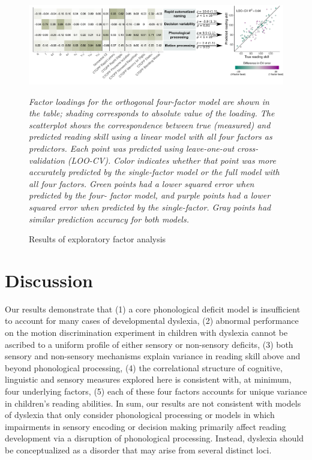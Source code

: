 \documentclass[../uwthesis.tex]{subfiles}
\begin{document}
\begin{figure}
    \centering
    \caption{Results of exploratory factor analysis}
    \label{fig:p3_fig_5}
    \includegraphics[width=18cm]{images/paper_3/5_factor_analysis.png}
    \item \textit{Factor loadings for the orthogonal four-factor model are shown in the table; shading
    corresponds to absolute value of the loading. The scatterplot shows the correspondence between
    true (measured) and predicted reading skill using a linear model with all four factors as
    predictors. Each point was predicted using leave-one-out cross-validation (LOO-CV). Color
    indicates whether that point was more accurately predicted by the single-factor model or the full
    model with all four factors. Green points had a lower squared error when predicted by the four-
    factor model, and purple points had a lower squared error when predicted by the single-factor.
    Gray points had similar prediction accuracy for both models.}
\end{figure}

\section{Discussion}
Our results demonstrate that (1) a core phonological deficit model is insufficient to account for many cases of developmental dyslexia, (2) abnormal performance on the motion discrimination experiment in children with dyslexia cannot be ascribed to a uniform profile of either sensory or non-sensory deficits, (3) both sensory and non-sensory mechanisms explain variance in reading skill above and beyond phonological processing, (4) the correlational structure of cognitive, linguistic and sensory measures explored here is consistent with, at minimum, four underlying factors, (5) each of these four factors accounts for unique variance in children’s reading abilities. In sum, our results are not consistent with models of dyslexia that only consider phonological processing or models in which impairments in sensory encoding or decision making primarily affect reading development via a disruption of phonological processing. Instead, dyslexia should be conceptualized as a disorder that may arise from several distinct loci.
\end{document}
